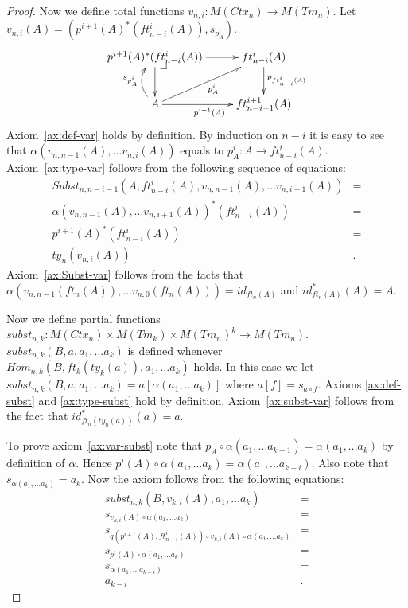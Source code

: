 \documentclass{amsart}
\makeatletter
\theoremstyle{definition}
\theoremstyle{remark}
\numberwithin{figure}{section}
\newcommand{\pb}[1][dr]{\save*!/#1-1.2pc/#1:(-1,1)@^{|-}\restore}
\makeatother
\begin{document}
\begin{proof}
Now we define total functions $v_{n,i} : M(Ctx_n) \to M(Tm_n)$.
Let $v_{n,i}(A) = (p^{i+1}(A)^*(ft^i_{n-i}(A)), s_{p^i_A})$.
\[ \xymatrix{ p^{i+1}(A)^*(ft^i_{n-i}(A)) \ar[r] \ar[d] \pb & ft^i_{n-i}(A) \ar[d]^{p_{ft^i_{n-i}(A)}} \\
              A \ar[r]_{p^{i+1}(A)} \ar@/^1pc/[u]^{s_{p^i_A}} \ar[ur]_{p^i_A} & ft^{i+1}_{n-i-1}(A)
            } \]
Axiom~\eqref{ax:def-var} holds by definition.
By induction on $n - i$ it is easy to see that $\alpha(v_{n,n-1}(A), \ldots v_{n,i}(A))$ equals to $p_A^i : A \to ft^i_{n-i}(A)$.
Axiom~\eqref{ax:type-var} follows from the following sequence of equations:
\begin{align*}
Subst_{n,n-i-1}(A, ft^i_{n-i}(A), v_{n,n-1}(A), \ldots v_{n,i+1}(A)) & = \\
\alpha(v_{n,n-1}(A), \ldots v_{n,i+1}(A))^*(ft^i_{n-i}(A)) & = \\
p^{i+1}(A)^*(ft^i_{n-i}(A)) & = \\
ty_n(v_{n,i}(A)) & .
\end{align*}
Axiom~\eqref{ax:Subst-var} follows from the facts that $\alpha(v_{n,n-1}(ft_n(A)), \ldots v_{n,0}(ft_n(A))) = id_{ft_n(A)}$ and $id_{ft_n(A)}^*(A) = A$.

Now we define partial functions $subst_{n,k} : M(Ctx_n) \times M(Tm_k) \times M(Tm_n)^k \to M(Tm_n)$.
$subst_{n,k}(B, a, a_1, \ldots a_k)$ is defined whenever $Hom_{n,k}(B, ft_k(ty_k(a)), a_1, \ldots a_k)$ holds.
In this case we let $subst_{n,k}(B, a, a_1, \ldots a_k) = a[\alpha(a_1, \ldots a_k)]$ where $a[f] = s_{a \circ f}$.
Axioms \eqref{ax:def-subst} and \eqref{ax:type-subst} hold by definition.
Axiom~\eqref{ax:subst-var} follows from the fact that $id_{ft_n(ty_n(a))}^*(a) = a$.

To prove axiom~\eqref{ax:var-subst} note that $p_A \circ \alpha(a_1, \ldots a_{k+1}) = \alpha(a_1, \ldots a_k)$ by definition of $\alpha$.
Hence $p^i(A) \circ \alpha(a_1, \ldots a_k) = \alpha(a_1, \ldots a_{k-i})$.
Also note that $s_{\alpha(a_1, \ldots a_k)} = a_k$.
Now the axiom follows from the following equations:
\begin{align*}
subst_{n,k}(B, v_{k,i}(A), a_1, \ldots a_k) & = \\
s_{v_{k,i}(A) \circ \alpha(a_1, \ldots a_k)} & = \\
s_{q(p^{i+1}(A), ft^i_{n-i}(A)) \circ v_{k,i}(A) \circ \alpha(a_1, \ldots a_k)} & = \\
s_{p^i(A) \circ \alpha(a_1, \ldots a_k)} & = \\
s_{\alpha(a_1, \ldots a_{k-i})} & = \\
a_{k-i} & .
\end{align*}


\end{proof}
\end{document}
